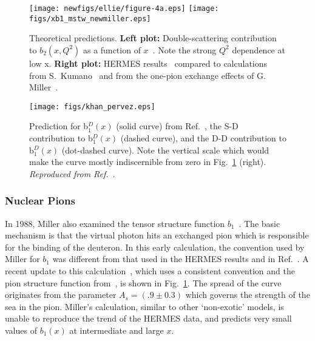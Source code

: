 \begin{figure}
\begin{center}
\texttt{[image: newfigs/ellie/figure-4a.eps]}
\hspace{0.3cm}
\texttt{[image: figs/xb1\_mstw\_newmiller.eps]}
\caption{\label{xb1_pred} Theoretical predictions. {\bf Left plot:} Double-scattering 
contribution to $b_2(x,Q^2)$ as a  function of $x$~\cite{Bora:1997pi}.  Note the strong $Q^2$ dependence at low x.
{\bf Right plot:} HERMES results~\cite{Airapetian:2005cb} compared to calculations 
from S.~Kumano~\cite{Kumano:2010vz} and from the one-pion exchange effects of 
G. Miller~\cite{Miller:1989nc,Miller_tmp}.}
\end{center}
\end{figure}

\begin{figure}
\begin{center}
\texttt{[image: figs/khan\_pervez.eps]}
\caption{\label{KHAN} Prediction for b$_1^D(x)$ (solid curve) from Ref.~\cite{Khan:1991qk}, the S-D contribution to b$_1^D(x)$ (dashed curve), and the D-D contribution to b$_1^D(x)$ (dot-dashed curve).  Note the vertical scale which would make the curve mostly indiscernible from zero in Fig.~\ref{xb1_pred} (right). {\it Reproduced from Ref.~\cite{Khan:1991qk}}.
}
\end{center}
\end{figure}
\subsubsection{Nuclear Pions}
In 1988, Miller also examined the tensor structure function $b_1$~\cite{Miller:1989nc}.
The basic mechanism is that the virtual photon hits an exchanged pion  which
is responsible for the binding of the deuteron. 
In this early calculation, the convention used by Miller for $b_1$ was different from that
used in the HERMES results and in Ref.~\cite{Kumano:2010vz}. A recent update to this  
calculation~\cite{Miller_tmp}, which uses a consistent convention and the pion structure
function from~\cite{Sutton:1991ay}, is shown in Fig.~\ref{xb1_pred}. The spread of the curve originates from the 
parameter $A_s=(.9 \pm 0.3)$ which governs the strength of the sea in the pion. 
Miller's calculation, similar to other `non-exotic' models, is unable to reproduce the trend of the HERMES data, and predicts very small values of $b_1(x)$ at intermediate and large $x$.

